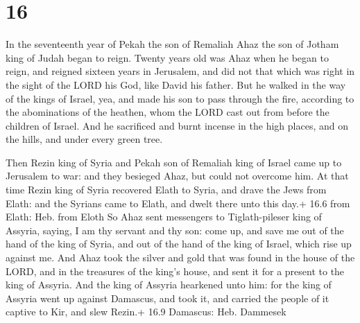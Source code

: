 \hypertarget{section-15}{%
\section{16}\label{section-15}}

 In the seventeenth year of Pekah the son of Remaliah Ahaz
the son of Jotham king of Judah began to reign.  Twenty
years old was Ahaz when he began to reign, and reigned sixteen years in
Jerusalem, and did not that which was right in the sight of the LORD his
God, like David his father.  But he walked in the way of the
kings of Israel, yea, and made his son to pass through the fire,
according to the abominations of the heathen, whom the LORD cast out
from before the children of Israel.  And he sacrificed and
burnt incense in the high places, and on the hills, and under every
green tree.

 Then Rezin king of Syria and Pekah son of Remaliah king
of Israel came up to Jerusalem to war: and they besieged Ahaz, but could
not overcome him.  At that time Rezin king of Syria
recovered Elath to Syria, and drave the Jews from Elath: and the Syrians
came to Elath, and dwelt there unto this day.+ 16.6 from Elath: Heb.
from Eloth  So Ahaz sent messengers to Tiglath-pileser king
of Assyria, saying, I am thy servant and thy son: come up, and save me
out of the hand of the king of Syria, and out of the hand of the king of
Israel, which rise up against me.  And Ahaz took the silver
and gold that was found in the house of the LORD, and in the treasures
of the king's house, and sent it for a present to the king of Assyria.
 And the king of Assyria hearkened unto him: for the king of
Assyria went up against Damascus, and took it, and carried the people of
it captive to Kir, and slew Rezin.+ 16.9 Damascus: Heb. Dammesek

